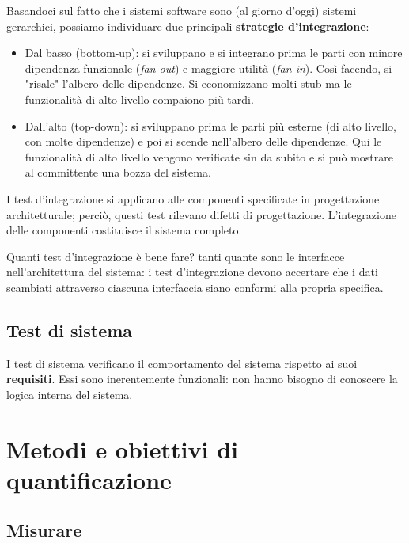 \documentclass[a4paper]{article}
\begin{document}
Basandoci sul fatto che i sistemi software sono (al giorno d'oggi) sistemi gerarchici, possiamo individuare due principali \textbf{strategie d'integrazione}:
		
	\begin{itemize}
		
			
	\item Dal basso (bottom-up): si sviluppano e si integrano prima le parti con minore dipendenza funzionale (\emph{fan-out}) e maggiore utilità (\emph{fan-in}). Così facendo, si "risale" l'albero delle dipendenze. Si economizzano molti stub ma le funzionalità di alto livello compaiono più tardi.
			
	\item Dall'alto (top-down): si sviluppano prima le parti più esterne (di alto livello, con molte dipendenze) e poi si scende nell'albero delle dipendenze. Qui le funzionalità di alto livello vengono verificate sin da subito e si può mostrare al committente una bozza del sistema.
		
	\end{itemize}

		
I test d'integrazione si applicano alle componenti specificate in progettazione architetturale; perciò, questi test rilevano difetti di progettazione. L'integrazione delle componenti costituisce il sistema completo.
		
Quanti test d'integrazione è bene fare? tanti quante sono le interfacce nell'architettura del sistema: i test d'integrazione devono accertare che i dati scambiati attraverso ciascuna interfaccia siano conformi alla propria specifica.

		
	\subsection{Test di sistema}

		
I test di sistema verificano il comportamento del sistema rispetto ai suoi \textbf{requisiti}. Essi sono inerentemente funzionali: non hanno bisogno di conoscere la logica interna del sistema.
	


		
	\section{Metodi e obiettivi di quantificazione}


		
	\subsection{Misurare}
\end{document}

